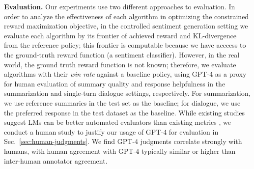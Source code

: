 \documentclass{article}
\begin{document}
\textbf{Evaluation.} Our experiments use two different approaches to evaluation. In order to analyze the effectiveness of each algorithm in optimizing the constrained reward maximization objective, in the controlled sentiment generation setting we evaluate each algorithm by its frontier of achieved reward and KL-divergence from the reference policy; this frontier is computable because we have acccess to the ground-truth reward function (a sentiment classifier). However, in the real world, the ground truth reward function is not known; therefore, we evaluate algorithms with their \textit{win rate} against a baseline policy, using GPT-4 as a proxy for human evaluation of summary quality and response helpfulness in the summarization and single-turn dialogue settings, respectively. For summarization, we use reference summaries in the test set as the baseline; for dialogue, we use the preferred response in the test dataset as the baseline. While existing studies suggest LMs can be better automated evaluators than existing metrics \citep{Chen2023ExploringTU}, we conduct a human study to justify our usage of GPT-4 for evaluation in Sec.~\ref{sec:human-judgments}. We find GPT-4 judgments correlate strongly with humans, with human agreement with GPT-4 typically similar or higher than inter-human annotator agreement. 
\end{document}
